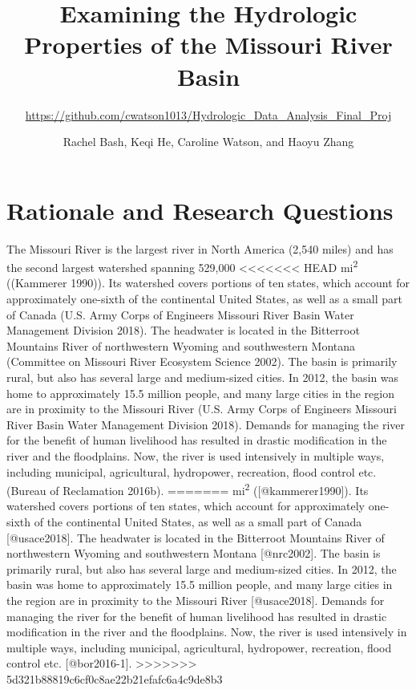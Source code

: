 \documentclass[12pt,]{article}
\title{Examining the Hydrologic Properties of the Missouri River Basin}
\subtitle{\url{https://github.com/cwatson1013/Hydrologic_Data_Analysis_Final_Proj}}
\author{Rachel Bash, Keqi He, Caroline Watson, and Haoyu Zhang}
\date{}
\begin{document}
\maketitle

\newpage

\hypertarget{rationale-and-research-questions}{%
\section{Rationale and Research
Questions}\label{rationale-and-research-questions}}

The Missouri River is the largest river in North America (2,540 miles)
and has the second largest watershed spanning 529,000
<<<<<<< HEAD
mi\textsuperscript{2} ((Kammerer 1990)). Its watershed covers portions
of ten states, which account for approximately one-sixth of the
continental United States, as well as a small part of Canada (U.S. Army
Corps of Engineers Missouri River Basin Water Management Division 2018).
The headwater is located in the Bitterroot Mountains River of
northwestern Wyoming and southwestern Montana (Committee on Missouri
River Ecosystem Science 2002). The basin is primarily rural, but also
has several large and medium-sized cities. In 2012, the basin was home
to approximately 15.5 million people, and many large cities in the
region are in proximity to the Missouri River (U.S. Army Corps of
Engineers Missouri River Basin Water Management Division 2018). Demands
for managing the river for the benefit of human livelihood has resulted
in drastic modification in the river and the floodplains. Now, the river
is used intensively in multiple ways, including municipal, agricultural,
hydropower, recreation, flood control etc. (Bureau of Reclamation
2016b).
=======
mi\textsuperscript{2} ({[}@kammerer1990{]}). Its watershed covers
portions of ten states, which account for approximately one-sixth of the
continental United States, as well as a small part of Canada
{[}@usace2018{]}. The headwater is located in the Bitterroot Mountains
River of northwestern Wyoming and southwestern Montana {[}@nrc2002{]}.
The basin is primarily rural, but also has several large and
medium-sized cities. In 2012, the basin was home to approximately 15.5
million people, and many large cities in the region are in proximity to
the Missouri River {[}@usace2018{]}. Demands for managing the river for
the benefit of human livelihood has resulted in drastic modification in
the river and the floodplains. Now, the river is used intensively in
multiple ways, including municipal, agricultural, hydropower,
recreation, flood control etc. {[}@bor2016-1{]}.
>>>>>>> 5d321b88819c6cf0c8ae22b21efafc6a4c9de8b3
\end{document}
